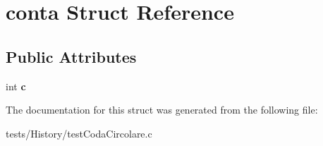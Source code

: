 \hypertarget{structconta}{}\section{conta Struct Reference}
\label{structconta}
\subsection*{Public Attributes}
\begin{DoxyCompactItemize}
\item 
\mbox{\label{structconta_a9534981bfe514fa9b837914023a86e11}} 
int {\bfseries c}
\end{DoxyCompactItemize}


The documentation for this struct was generated from the following file\+:\begin{DoxyCompactItemize}
\item 
tests/\+History/test\+Coda\+Circolare.\+c\end{DoxyCompactItemize}
